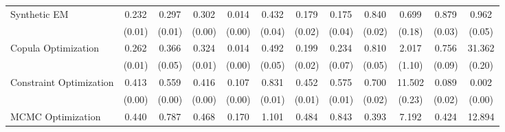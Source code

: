 \begin{table}[ht]
{\begin{tabular}{l cccc cccc cc c}
            \addlinespace[0.2em]
            Synthetic EM            & 0.232                                           & 0.297                                        & 0.302                                         & 0.014                   & 0.432            & 0.179         & 0.175       & 0.840        & 0.699           & 0.879        & 0.962             \\
                                    & (0.01)                                          & (0.01)                                       & (0.00)                                        & (0.00)                  & (0.04)           & (0.02)        & (0.04)      & (0.02)       & (0.18)          & (0.03)       & (0.05)            \\
            \addlinespace[0.2em]
            Copula Optimization     & 0.262                                           & 0.366                                        & 0.324                                         & 0.014                   & 0.492            & 0.199         & 0.234       & 0.810        & 2.017           & 0.756        & 31.362            \\
                                    & (0.01)                                          & (0.05)                                       & (0.01)                                        & (0.00)                  & (0.05)           & (0.02)        & (0.07)      & (0.05)       & (1.10)          & (0.09)       & (0.20)            \\
            \addlinespace[0.2em]
            Constraint Optimization & 0.413                                           & 0.559                                        & 0.416                                         & 0.107                   & 0.831            & 0.452         & 0.575       & 0.700        & 11.502          & 0.089        & 0.002             \\
                                    & (0.00)                                          & (0.00)                                       & (0.00)                                        & (0.00)                  & (0.01)           & (0.01)        & (0.01)      & (0.02)       & (0.23)          & (0.02)       & (0.00)            \\
            \addlinespace[0.2em]
            MCMC Optimization       & 0.440                                           & 0.787                                        & 0.468                                         & 0.170                   & 1.101            & 0.484         & 0.843       & 0.393        & 7.192           & 0.424        & 12.894            \\

\end{tabular}}
\end{table}
